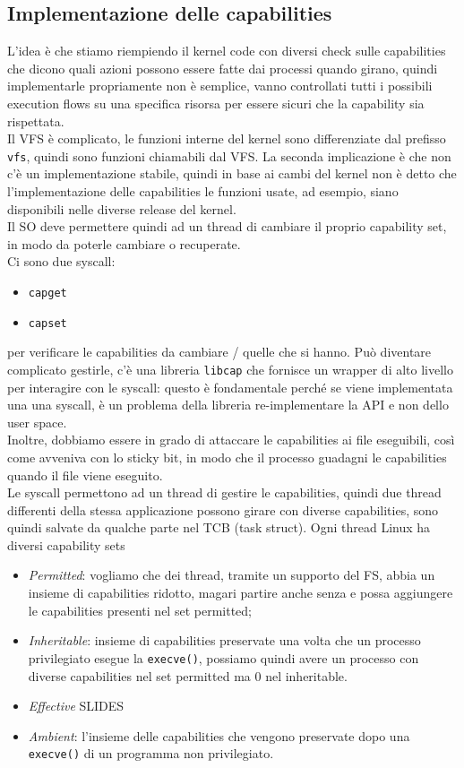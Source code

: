 \documentclass[12pt, oneside]{extbook} %
\begin{document}
\subsection{Implementazione delle capabilities}
L'idea è che stiamo riempiendo il kernel code con diversi check sulle capabilities che dicono quali azioni possono essere fatte dai processi quando girano, quindi implementarle propriamente non è semplice, vanno controllati tutti i possibili execution flows su una specifica risorsa per essere sicuri che la capability sia rispettata.\\Il VFS è complicato, le funzioni interne del kernel sono differenziate dal prefisso \texttt{vfs}, quindi sono funzioni chiamabili dal VFS. La seconda implicazione è che non c'è un implementazione stabile, quindi in base ai cambi del kernel non è detto che l'implementazione delle capabilities le funzioni usate, ad esempio, siano disponibili nelle diverse release del kernel.\\Il SO deve permettere quindi ad un thread di cambiare il proprio capability set, in modo da poterle cambiare o recuperate.\\Ci sono due syscall:
\begin{itemize}
\item \texttt{capget}
\item \texttt{capset}
\end{itemize}
per verificare le capabilities da cambiare / quelle che si hanno. Può diventare complicato gestirle, c'è una libreria \texttt{libcap} che fornisce un wrapper di alto livello per interagire con le syscall: questo è fondamentale perché se viene implementata una una syscall, è un problema della libreria re-implementare la API e non dello user space.\\Inoltre, dobbiamo essere in grado di attaccare le capabilities ai file eseguibili, così come avveniva con lo sticky bit, in modo che il processo guadagni le capabilities quando il file viene eseguito.\\Le syscall permettono ad un thread di gestire le capabilities, quindi due thread differenti della stessa applicazione possono girare con diverse capabilities, sono quindi salvate da qualche parte nel TCB (task struct). Ogni thread Linux ha diversi capability sets
\begin{itemize}
\item \textit{Permitted}: vogliamo che dei thread, tramite un supporto del FS, abbia un insieme di capabilities ridotto, magari partire anche senza e possa aggiungere le capabilities presenti nel set permitted;
\item \textit{Inheritable}: insieme di capabilities preservate una volta che un processo privilegiato esegue la \texttt{execve()}, possiamo quindi avere un processo con diverse capabilities nel set permitted ma 0 nel inheritable.
\item \textit{Effective} SLIDES
\item \textit{Ambient}: l'insieme delle capabilities che vengono preservate dopo una \texttt{execve()} di un programma non privilegiato. 
\end{itemize}
\end{document}
